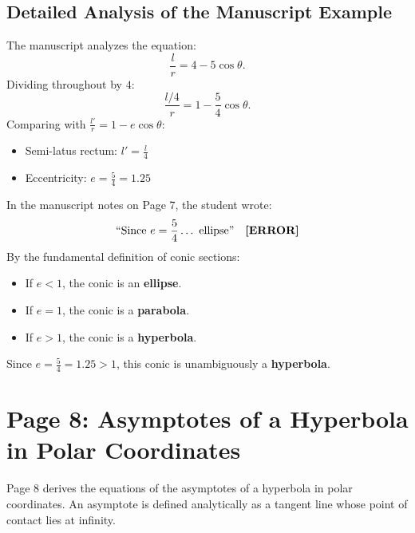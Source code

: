 \subsection{Detailed Analysis of the Manuscript Example}
The manuscript analyzes the equation:
\begin{equation}
    \frac{l}{r} = 4 - 5\cos\theta.
\end{equation}
Dividing throughout by $4$:
\begin{equation}
    \frac{l/4}{r} = 1 - \frac{5}{4}\cos\theta.
\end{equation}
Comparing with $\frac{l'}{r} = 1 - e\cos\theta$:
\begin{itemize}[noitemsep]
    \item Semi-latus rectum: $l' = \frac{l}{4}$
    \item Eccentricity: $e = \frac{5}{4} = 1.25$
\end{itemize}

\begin{notebox}
In the manuscript notes on Page 7, the student wrote:
\begin{equation*}
    \text{``Since } e = \frac{5}{4} \dots \text{ ellipse''} \quad \text{\textbf{[ERROR]}}
\end{equation*}
By the fundamental definition of conic sections:
\begin{itemize}[noitemsep]
    \item If $e < 1$, the conic is an \textbf{ellipse}.
    \item If $e = 1$, the conic is a \textbf{parabola}.
    \item If $e > 1$, the conic is a \textbf{hyperbola}.
\end{itemize}
Since $e = \frac{5}{4} = 1.25 > 1$, this conic is unambiguously a \textbf{hyperbola}.
\end{notebox}

\newpage
\section{Page 8: Asymptotes of a Hyperbola in Polar Coordinates}
\label{sec:page08}

\begin{conceptbox}
Page 8 derives the equations of the asymptotes of a hyperbola in polar coordinates. An asymptote is defined analytically as a tangent line whose point of contact lies at infinity.
\end{conceptbox}

